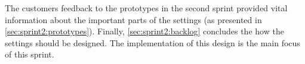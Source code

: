The customers feedback to the prototypes in the second sprint provided vital information about the important parts of the settings (as presented in \cref{sec:sprint2:prototypes}).
Finally, \cref{sec:sprint2:backlog} concludes the how the settings should be designed.
The implementation of this design is the main focus of this sprint.